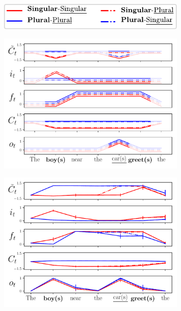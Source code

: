 \begin{figure}[ht]
    \centering
    \begin{subfigure}{\textwidth}
            \centering
            \includegraphics[width=0.3\linewidth]{Figures/legend.pdf}
    \end{subfigure}
    \bigskip
    \begin{subfigure}{0.32\textwidth}
            \centering
            \includegraphics[width=\linewidth]{Figures/unit-timeseries-cartoon.pdf}
    \label{fig:cartoon}
    \end{subfigure}
    \begin{subfigure}{0.32\textwidth}
            \centering
            \includegraphics[width=\linewidth]{Figures/nounpp_987.pdf}

\end{subfigure}
\end{figure}
